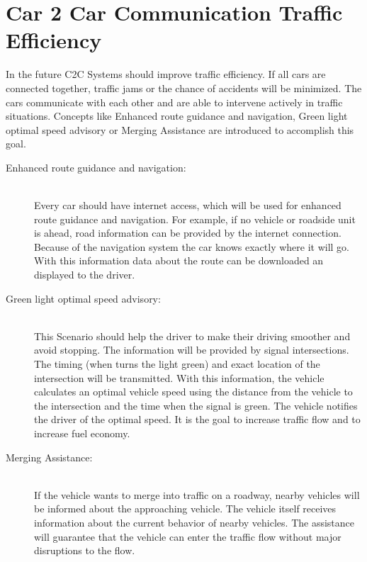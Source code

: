 \section{Car 2 Car Communication Traffic Efficiency}
\label{sec:C2CTarfficEfficiency}
In the future C2C Systems should improve traffic efficiency. If all cars are connected together, traffic jams or the chance of accidents will be minimized. The cars communicate with each other and are able to intervene actively in traffic situations. Concepts like Enhanced route guidance and navigation, Green light optimal speed advisory or Merging Assistance are introduced to accomplish this goal.\\
\begin{description}
  \item[Enhanced route guidance and navigation:] \hfill \\ Every car should have internet access, which will be used for enhanced route guidance and navigation. For example, if no vehicle or roadside unit is ahead, road information can be provided by the internet connection. Because of the navigation system the car knows exactly where it will go. With this information data about the route can be downloaded an displayed to the driver.\cite{c2cmanifesto} 
  \item[Green light optimal speed advisory:] \hfill \\ This Scenario should help the driver to make their driving smoother and avoid stopping. The information will be provided by signal intersections. The timing (when turns the light green) and exact location of the intersection will be transmitted. With this information, the vehicle calculates an optimal vehicle speed using the distance from the vehicle to the intersection and the time when the signal is green. The vehicle notifies the driver of the optimal speed. It is the goal to increase traffic flow and to increase fuel economy.\cite{c2cmanifesto}
  \item[Merging Assistance:] \hfill \\ If the vehicle wants to merge into traffic on a roadway, nearby vehicles will be informed about the approaching vehicle. The vehicle itself receives information about the current behavior of nearby vehicles. The assistance will guarantee that the vehicle can enter the traffic flow without major disruptions to the flow.\cite{c2cmanifesto}
\end{description}	

